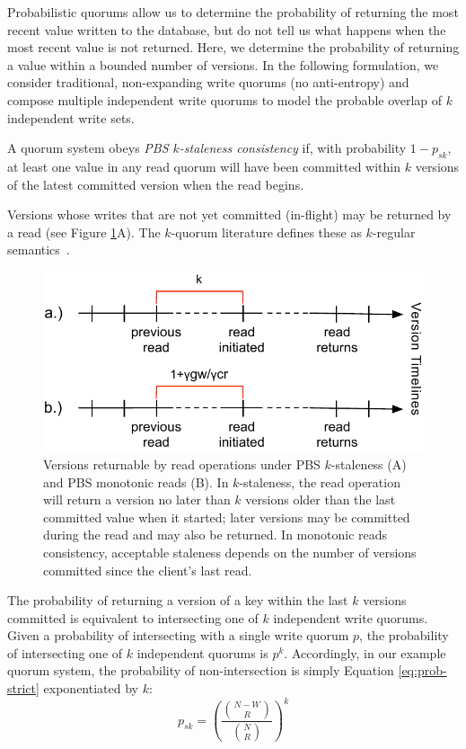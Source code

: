 \documentclass{vldb}
\begin{document}
Probabilistic quorums allow us to determine the probability of
returning the most recent value written to the database, but do not
tell us what happens when the most recent value is not returned.
Here, we determine the probability of returning a value within a
bounded number of versions.  In the following formulation, we consider
traditional, non-expanding write quorums (no anti-entropy) and compose
multiple independent write quorums to model the probable overlap of
$k$ independent write sets.
\begin{definition}
A quorum system obeys \textit{PBS $k$-staleness consistency} if, with
probability $1-p_{sk}$, at least one value in any read quorum will
have been committed within $k$ versions of the latest committed
version when the read begins.
\end{definition}
Versions whose writes that are not yet committed (in-flight) may be
returned by a read (see Figure \ref{fig:timelines}A).  The $k$-quorum
literature defines these as $k$-regular semantics~\cite{non-strict}.

\begin{figure}
\centering
\includegraphics[width=\columnwidth]{figs/timelines.pdf}
\vspace{-16pt}
\caption{Versions returnable by read operations under PBS
  $k$-staleness (A) and PBS monotonic reads (B). In $k$-staleness, the
  read operation will return a version no later than $k$ versions
  older than the last committed value when it started; later versions
  may be committed during the read and may also be returned.  In
  monotonic reads consistency, acceptable staleness depends on the
  number of versions committed since the client's last read.}
\vspace{-12pt}
\label{fig:timelines}
\end{figure}

The probability of returning a version of a key within the last $k$
versions committed is equivalent to intersecting one of $k$
independent write quorums.  Given a probability of intersecting with a
single write quorum $p$, the probability of intersecting one of $k$
independent quorums is $p^k$.  Accordingly, in our example quorum
system, the probability of non-intersection is simply Equation
\ref{eq:prob-strict} exponentiated by $k$:
\begin{equation}
\label{eq:k-consistency}
p_{sk} = \left(\frac{{N-W \choose R}}{{N \choose R}}\right)^k
\end{equation}
\end{document}
